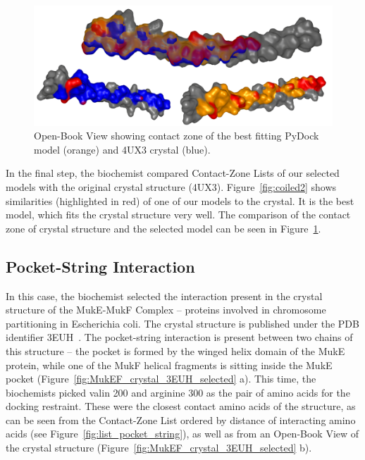 \documentclass[twocolumn]{bmcart}%
\def\OpBook {Open-Book View\xspace}
\def\CoZoList{Contact-Zone List\xspace}
\def\CoZoLists{Contact-Zone Lists\xspace}
\begin{document}
\begin{figure}[b!]
  \centering
    \vspace{-5pt}
  \includegraphics[width=0.95\columnwidth]{images/figure14.png}
     \vspace{-15pt}
  \caption{\OpBook showing contact zone of  the best fitting PyDock model (orange) and 4UX3 crystal (blue).}
  \label{fig:selection_4_final_SMC3_PyDock}
\end{figure}

In the final step, the biochemist compared \CoZoLists of our selected models with the original crystal structure (4UX3). 
Figure~\ref{fig:coiled2} shows similarities (highlighted in red) of one of our models to the crystal. It is the best model, which fits the crystal structure very well. The comparison of the contact zone of crystal structure and the selected model can be seen in Figure~\ref{fig:selection_4_final_SMC3_PyDock}.

\subsection{Pocket-String Interaction}
In this case, the biochemist selected the interaction present in the crystal structure of the MukE-MukF Complex -- proteins involved in chromosome partitioning in Escherichia coli. 
The crystal structure is published under the PDB identifier 3EUH~\cite{Woo}. 
The pocket-string interaction is present between two chains of this structure -- the pocket is formed by the winged helix domain of the MukE protein, while one of the MukF helical fragments is sitting inside the MukE pocket (Figure~\ref{fig:MukEF_crystal_3EUH_selected} a). 
This time, the biochemists picked valin 200 and arginine 300 as the pair of amino acids for the docking restraint. 
These were the closest contact amino acids of the structure, as can be seen from the \CoZoList ordered by distance of interacting amino acids (see Figure~\ref{fig:list_pocket_string}), as well as from an \OpBook of the crystal structure (Figure~\ref{fig:MukEF_crystal_3EUH_selected} b). 
\end{document}
